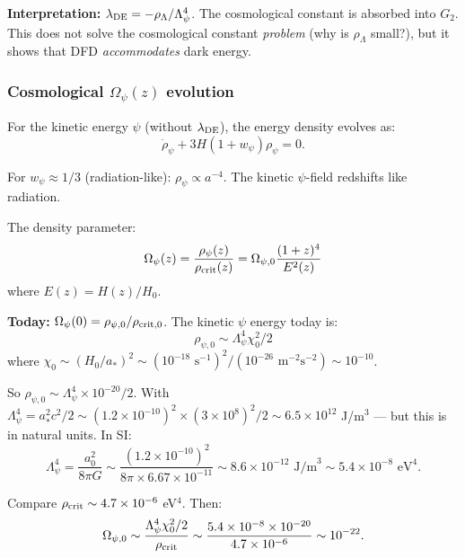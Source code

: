 \documentclass[11pt,a4paper]{article}
\begin{document}
\textbf{Interpretation:} $\lambda_{\rm DE} = -\rho_\Lambda/\Lambda_\psi^4$. The cosmological constant is absorbed into $G_2$. This does not solve the cosmological constant \emph{problem} (why is $\rho_\Lambda$ small?), but it shows that DFD \emph{accommodates} dark energy.

\subsubsection{Cosmological $\Omega_\psi(z)$ evolution}

For the kinetic energy $\psi$ (without $\lambda_{\rm DE}$), the energy density evolves as:
\begin{equation}
\dot\rho_\psi + 3H(1+w_\psi)\rho_\psi = 0.
\end{equation}

For $w_\psi \approx 1/3$ (radiation-like): $\rho_\psi \propto a^{-4}$. The kinetic $\psi$-field redshifts like radiation.

The density parameter:
\begin{equation}
\Omega_\psi(z) = \frac{\rho_\psi(z)}{\rho_{\rm crit}(z)} = \Omega_{\psi,0}\frac{(1+z)^{4}}{E^2(z)}
\end{equation}
where $E(z) = H(z)/H_0$.

\textbf{Today:} $\Omega_\psi(0) = \rho_{\psi,0}/\rho_{\rm crit,0}$. The kinetic $\psi$ energy today is:
\begin{equation}
\rho_{\psi,0} \sim \Lambda_\psi^4 \chi_0^2/2
\end{equation}
where $\chi_0 \sim (H_0/a_*)^2 \sim (10^{-18}\text{ s}^{-1})^2/(10^{-26}\text{ m}^{-2}\text{s}^{-2}) \sim 10^{-10}$.

So $\rho_{\psi,0} \sim \Lambda_\psi^4 \times 10^{-20}/2$. With $\Lambda_\psi^4 = a_*^2 c^2/2 \sim (1.2\times10^{-10})^2 \times (3\times10^8)^2/2 \sim 6.5 \times 10^{12}$ J/m$^3$ --- but this is in natural units. In SI:
\begin{equation}
\Lambda_\psi^4 = \frac{a_0^2}{8\pi G} \sim \frac{(1.2\times10^{-10})^2}{8\pi \times 6.67\times10^{-11}} \sim 8.6 \times 10^{-12}\text{ J/m}^3 \sim 5.4 \times 10^{-8}\text{ eV}^4.
\end{equation}

Compare $\rho_{\rm crit} \sim 4.7 \times 10^{-6}$ eV$^4$. Then:
\begin{equation}
\Omega_{\psi,0} \sim \frac{\Lambda_\psi^4 \chi_0^2/2}{\rho_{\rm crit}} \sim \frac{5.4\times10^{-8} \times 10^{-20}}{4.7\times10^{-6}} \sim 10^{-22}.
\end{equation}
\end{document}
